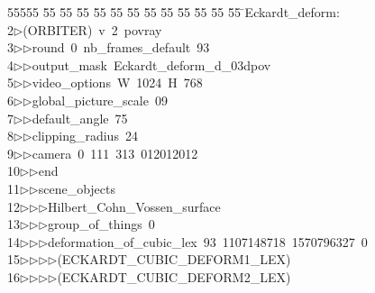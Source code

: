 %
%
\begin{tabbing}
55555 \= 55 \= 55 \= 55 \= 55 \= 55 \= 55 \= 55 \= 55 \= 55 \= 55 \= 55 \= 55 \= \>Eckardt\_deform:\\[0pt]
2\>$\triangleright$\>(ORBITER)\ v\ 2\ povray\ \\[0pt]
3\>$\triangleright$\>$\triangleright$\>round\ 0\ nb\_frames\_default\ 93\ \\[0pt]
4\>$\triangleright$\>$\triangleright$\>output\_mask\ Eckardt\_deform\_d\_03dpov\ \\[0pt]
5\>$\triangleright$\>$\triangleright$\>video\_options\ W\ 1024\ H\ 768\ \\[0pt]
6\>$\triangleright$\>$\triangleright$\>global\_picture\_scale\ 09\ \\[0pt]
7\>$\triangleright$\>$\triangleright$\>default\_angle\ 75\ \\[0pt]
8\>$\triangleright$\>$\triangleright$\>clipping\_radius\ 24\ \\[0pt]
9\>$\triangleright$\>$\triangleright$\>camera\ 0\ 111\ 313\ 012012012\ \\[0pt]
10\>$\triangleright$\>$\triangleright$\>end\ \\[0pt]
11\>$\triangleright$\>$\triangleright$\>scene\_objects\ \\[0pt]
12\>$\triangleright$\>$\triangleright$\>$\triangleright$\>Hilbert\_Cohn\_Vossen\_surface\ \\[0pt]
13\>$\triangleright$\>$\triangleright$\>$\triangleright$\>group\_of\_things\ 0\ \\[0pt]
14\>$\triangleright$\>$\triangleright$\>$\triangleright$\>deformation\_of\_cubic\_lex\ 93\ 1107148718\ 1570796327\ 0\ \\[0pt]
15\>$\triangleright$\>$\triangleright$\>$\triangleright$\>$\triangleright$\>(ECKARDT\_CUBIC\_DEFORM1\_LEX)\ \\[0pt]
16\>$\triangleright$\>$\triangleright$\>$\triangleright$\>$\triangleright$\>(ECKARDT\_CUBIC\_DEFORM2\_LEX)\ \\[0pt]

\end{tabbing}

